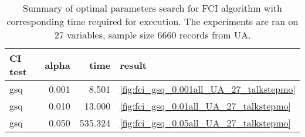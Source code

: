 \begin{table}
\caption{Summary of optimal parameters search for FCI algorithm with corresponding time required for execution. The experiments are ran on 27 variables, sample size 6660 records from UA.}
\label{tab:fci_parameters_time_UA_27_talkstepmo}
\begin{tabular}{lrrl}
\toprule
CI test & alpha & time & result \\
\midrule
gsq & 0.001 & 8.501 & \ref{fig:fci_gsq_0.001all_UA_27_talkstepmo} \\
gsq & 0.010 & 13.000 & \ref{fig:fci_gsq_0.01all_UA_27_talkstepmo} \\
gsq & 0.050 & 535.324 & \ref{fig:fci_gsq_0.05all_UA_27_talkstepmo} \\
\bottomrule
\end{tabular}
\end{table}
